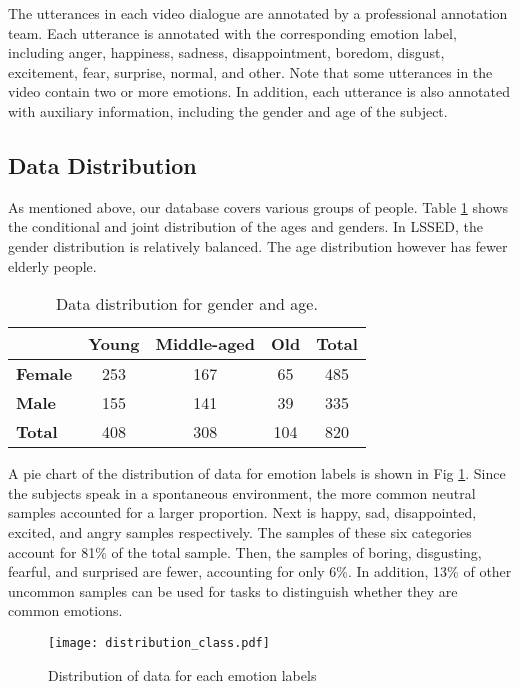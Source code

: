 \documentclass{article}
\begin{document}
The utterances in each video dialogue are annotated by a professional annotation team.
Each utterance is annotated with the corresponding emotion label, including anger, happiness, sadness, disappointment, boredom, disgust, excitement, fear, surprise, normal, and other.
Note that some utterances in the video contain two or more emotions. 
In addition, each utterance is also annotated with auxiliary information, including the gender and age of the subject.


\subsection{Data Distribution}
As mentioned above, our database covers various groups of people.
Table \ref{tab:dis_gend_age} shows the conditional and joint distribution of the ages and genders.
In LSSED, the gender distribution is relatively balanced. The age distribution however has fewer elderly people.

\begin{table}[htbp]
  \caption{Data distribution for gender and age.}
  \label{tab:dis_gend_age}
\centering
  \begin{tabular}{ lccc|c }
    \hline
    \textbf{} & \textbf{Young} & \textbf{Middle-aged} & \textbf{Old} & \textbf{Total}\\
    \hline
    \textbf{Female} &   253 &   167 &   65  &   485  \\
    \textbf{Male}   &   155 &   141 &   39  &   335  \\
    \hline
    \textbf{Total}  &   408 &   308 &   104 &   820  \\
    \hline
    \end{tabular}
\end{table}

A pie chart of the distribution of data for emotion labels is shown in Fig \ref{fig:dis_class}.
Since the subjects speak in a spontaneous environment, the more common neutral samples accounted for a larger proportion.
Next is happy, sad, disappointed, excited, and angry samples respectively.
The samples of these six categories account for 81\% of the total sample.
Then, the samples of boring, disgusting, fearful, and surprised are fewer, accounting for only 6\%.
In addition, 13\% of other uncommon samples can be used for tasks to distinguish whether they are common emotions.

\begin{figure}[t]
  \centering
  \texttt{[image: distribution\_class.pdf]}
  \caption{Distribution of data for each emotion labels}
  \label{fig:dis_class}
\end{figure}
\end{document}
